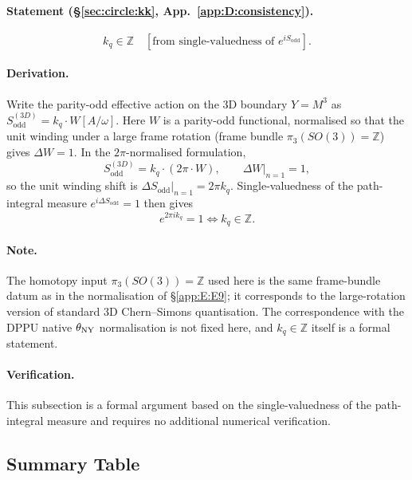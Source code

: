 \paragraph{Statement (\S\ref{sec:circle:kk}, App.~\ref{app:D:consistency}).}
\begin{equation}
  k_q\in\mathbb{Z}\quad
  [\text{from single-valuedness of } e^{i S_{\mathrm{odd}}}].
\end{equation}

\paragraph{Derivation.}
Write the parity-odd effective action on the 3D boundary $Y = M^3$ as
$S_{\mathrm{odd}}^{(3D)} = k_q\cdot W[A/\omega]$.  Here $W$ is a parity-odd
functional, normalised so that the unit winding under a large frame
rotation (frame bundle $\pi_3(SO(3)) = \mathbb{Z}$) gives $\Delta W = 1$.
In the $2\pi$-normalised formulation,
\begin{equation}
  S_{\mathrm{odd}}^{(3D)} = k_q\cdot(2\pi\cdot W),\qquad
  \Delta W|_{n=1} = 1,
\end{equation}
so the unit winding shift is $\Delta S_{\mathrm{odd}}|_{n=1} = 2\pi k_q$.
Single-valuedness of the path-integral measure
$e^{i\Delta S_{\mathrm{odd}}} = 1$ then gives
\begin{equation}
  e^{2\pi i k_q} = 1 \iff k_q\in\mathbb{Z}.
\end{equation}

\paragraph{Note.}
The homotopy input $\pi_3(SO(3)) = \mathbb{Z}$ used here is the same
frame-bundle datum as in the normalisation of \S\ref{app:E:E9}; it
corresponds to the large-rotation version of standard 3D Chern--Simons
quantisation.  The correspondence with the DPPU native $\theta_{\mathrm{NY}}$
normalisation is not fixed here, and $k_q\in\mathbb{Z}$ itself is a formal
statement.

\paragraph{Verification.}
This subsection is a formal argument based on the single-valuedness of the
path-integral measure and requires no additional numerical verification.

\subsection{Summary Table}
\label{app:E:summary}

